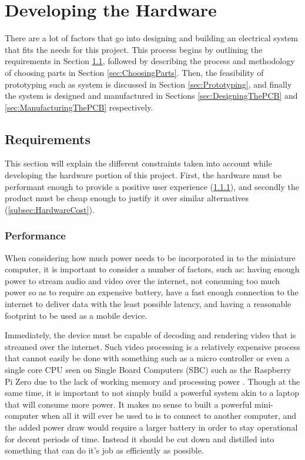 \chapter{Developing the Hardware} %

\label{Chapter4} %

There are a lot of factors that go into designing and building an electrical system that fits the needs for this project.
This process begins by outlining the requirements in Section \ref{sec:HardwareRequirements}, followed by describing the process and methodology of choosing parts in Section \ref{sec:ChoosingParts}.
Then, the feasibility of prototyping such as system is discussed in Section \ref{sec:Prototyping}, and finally the system is designed and manufactured in Sections \ref{sec:DesigningThePCB} and \ref{sec:ManufacturingThePCB} respectively.

\section{Requirements}\label{sec:HardwareRequirements}

This section will explain the different constraints taken into account while developing the hardware portion of this project.
First, the hardware must be performant enough to provide a positive user experience (\ref{subsec:HardwarePerformance}), and secondly the product must be cheap enough to justify it over similar alternatives (\ref{subsec:HardwareCost}).

\subsection{Performance}\label{subsec:HardwarePerformance}

When considering how much power needs to be incorporated in to the miniature computer, it is important to consider a number of factors, such as: having enough power to stream audio and video over the internet, not consuming too much power so as to require an expensive battery, have a fast enough connection to the internet to deliver data with the least possible latency, and having a reasonable footprint to be used as a mobile device.

Immediately, the device must be capable of decoding and rendering video that is streamed over the internet.
Such video processing is a relatively expensive process that cannot easily be done with something such as a micro controller or even a single core CPU seen on Single Board Computers (SBC) such as the Raspberry Pi Zero due to the lack of working memory and processing power \cite{picockpit_2021}.
Though at the same time, it is important to not simply build a powerful system akin to a laptop that will consume more power.
It makes no sense to built a powerful mini-computer when all it will ever be used to is to connect to another computer, and the added power draw would require a larger battery in order to stay operational for decent periods of time.
Instead it should be cut down and distilled into something that can do it's job as efficiently as possible.

